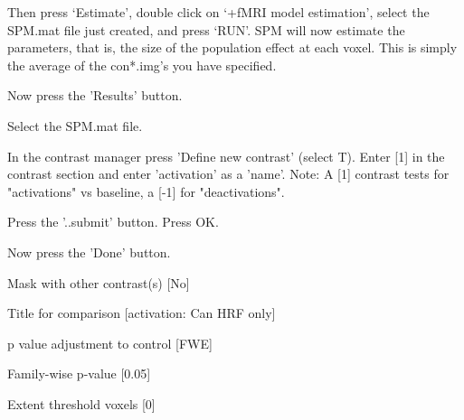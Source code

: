 Then press `Estimate', double click on `+fMRI model estimation', select the SPM.mat file just created, and press `RUN'.
SPM will now estimate the parameters, that is, the size of the population effect at each voxel. This is simply the average of the con*.img's you have specified.

\bi
\item{Now press the 'Results' button.}
\item{Select the SPM.mat file.}
\item{In the contrast manager press 'Define new contrast' (select T). Enter [1] in the contrast section and enter 'activation' as a 'name'. Note: A [1] contrast tests for "activations" vs baseline, a [-1] for "deactivations".}
\item{Press the '..submit' button. Press OK.}
\item{Now press the 'Done' button.}
\item{Mask with other contrast(s) [No]}
\item{Title for comparison [activation: Can HRF only]}
\item{p value adjustment to control [FWE]}
\item{Family-wise p-value [0.05]}
\item{Extent threshold {voxels} [0]}
\ei


